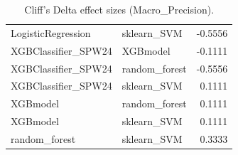 \begin{table}[t]
\begin{tabular}{llr}
LogisticRegression & sklearn_SVM & -0.5556 \\
XGBClassifier_SPW24 & XGBmodel & -0.1111 \\
XGBClassifier_SPW24 & random_forest & -0.5556 \\
XGBClassifier_SPW24 & sklearn_SVM & 0.1111 \\
XGBmodel & random_forest & 0.1111 \\
XGBmodel & sklearn_SVM & 0.1111 \\
random_forest & sklearn_SVM & 0.3333 \\
\bottomrule
\end{tabular}
\caption{Cliff's Delta effect sizes (Macro_Precision).}
\label{tab:cliffs_Macro_Precision}
\end{table}